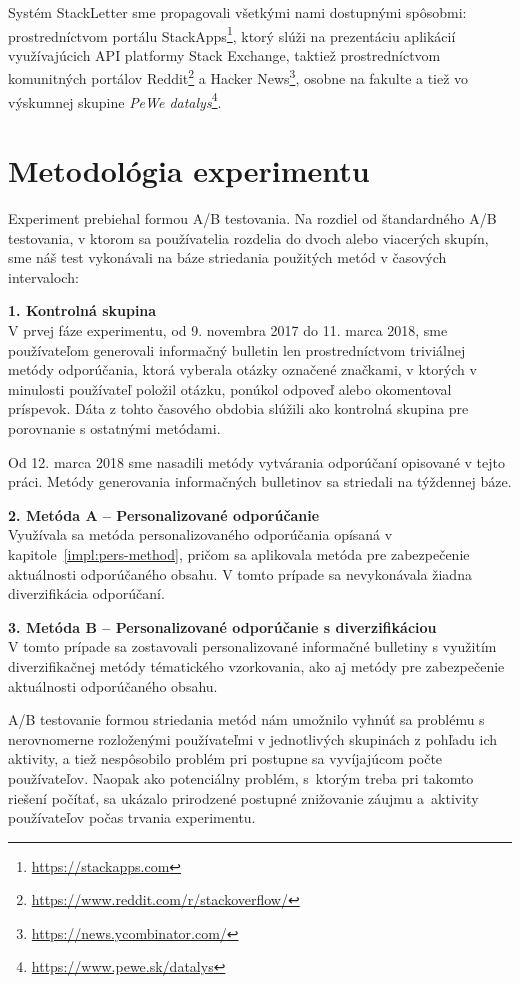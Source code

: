 Systém StackLetter sme propagovali všetkými nami dostupnými spôsobmi: prostredníctvom portálu StackApps\footnote{\url{https://stackapps.com}},
ktorý slúži na prezentáciu aplikácií využívajúcich API platformy Stack Exchange, taktiež prostredníctvom komunitných portálov
Reddit\footnote{\url{https://www.reddit.com/r/stackoverflow/}} a Hacker News\footnote{\url{https://news.ycombinator.com/}},
osobne na fakulte a tiež vo výskumnej skupine \textit{PeWe datalys}\footnote{\url{https://www.pewe.sk/datalys}}.


\section{Metodológia experimentu}
Experiment prebiehal formou A/B testovania. Na rozdiel od štandardného A/B testovania, v ktorom sa používatelia rozdelia
do dvoch alebo viacerých skupín, sme náš test vykonávali na báze striedania použitých metód v časových intervaloch:

\begin{adjustwidth}{1cm}{1cm}
\textbf{1. Kontrolná skupina}\\
V prvej fáze experimentu, od 9. novembra 2017 do 11. marca 2018, sme používateľom generovali informačný bulletin len
prostredníctvom triviálnej metódy odporúčania, ktorá vyberala otázky označené značkami, v ktorých v minulosti používateľ
položil otázku, ponúkol odpoveď alebo okomentoval príspevok. Dáta z tohto časového obdobia slúžili ako kontrolná skupina pre porovnanie
s ostatnými metódami.

Od 12. marca 2018 sme nasadili metódy vytvárania odporúčaní opisované v tejto práci. Metódy generovania informačných bulletinov
sa striedali na týždennej báze.

\textbf{2. Metóda A -- Personalizované odporúčanie}\\
Využívala sa metóda personalizovaného odporúčania opísaná v kapitole~\ref{impl:pers-method}, pričom sa aplikovala
metóda pre zabezpečenie aktuálnosti odporúčaného obsahu. V tomto prípade sa nevykonávala žiadna diverzifikácia odporúčaní.

\textbf{3. Metóda B -- Personalizované odporúčanie s diverzifikáciou}\\
V tomto prípade sa zostavovali personalizované informačné bulletiny s využitím diverzifikačnej metódy tématického
vzorkovania, ako aj metódy pre zabezpečenie aktuálnosti odporúčaného obsahu.
\end{adjustwidth}

A/B testovanie formou striedania metód nám umožnilo vyhnúť sa problému s nerovnomerne rozloženými používateľmi v jednotlivých
skupinách z pohľadu ich aktivity, a tiež nespôsobilo problém pri postupne sa vyvíjajúcom počte používateľov.
Naopak ako potenciálny problém, s~ktorým treba pri takomto riešení počítať, sa ukázalo prirodzené postupné znižovanie
záujmu a~aktivity používateľov počas trvania experimentu.


